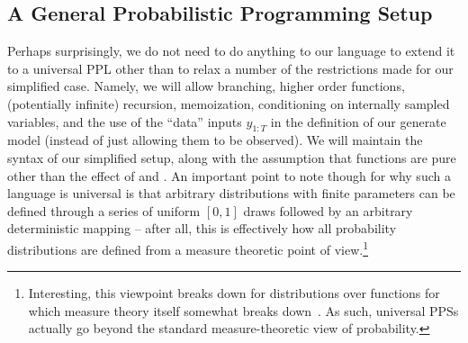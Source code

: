 %
%

\subsection{A General Probabilistic Programming Setup}
\label{sec:probprog:models:general}

Perhaps surprisingly, we do not need to do anything to our language to extend it to a universal
PPL other than to relax a number of the restrictions made for our simplified case.  Namely,
we will allow branching, higher order functions, (potentially infinite) recursion, memoization, conditioning on internally sampled
variables, and the use of the ``data'' inputs $y_{1:T}$ in the definition of our generate model (instead of
just allowing them to be observed).  We will maintain the syntax of our simplified
setup, along with the assumption that functions are pure other than the effect of \sample and \observe.
An important point to note though for why such a language is universal is that arbitrary distributions
with finite parameters can be defined through a series of uniform $[0,1]$ draws followed
by an arbitrary deterministic mapping -- after all, this is effectively how all probability distributions are
defined from a measure theoretic point of view.\footnote{Interesting, this viewpoint breaks down for
	distributions over functions for which measure theory itself somewhat breaks down~\cite{heunen2017convenient}.
	As such, universal PPSs actually go beyond the standard measure-theoretic view of probability.}


